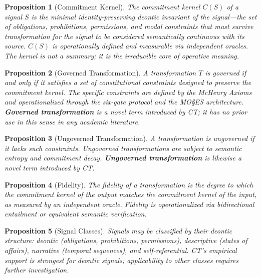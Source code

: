 \documentclass[11pt,a4paper]{article}
\newtheorem{proposition}{Proposition}[section]
\begin{document}
\begin{proposition}[Commitment Kernel]
The \emph{commitment kernel} $C(S)$ of a signal $S$ is the minimal identity-preserving deontic invariant of the signal---the set of obligations, prohibitions, permissions, and modal constraints that must survive transformation for the signal to be considered semantically continuous with its source. $C(S)$ is operationally defined and measurable via independent oracles. The kernel is not a summary; it is the irreducible core of operative meaning.
\end{proposition}

\begin{proposition}[Governed Transformation]
A transformation $T$ is \emph{governed} if and only if it satisfies a set of constitutional constraints designed to preserve the commitment kernel. The specific constraints are defined by the McHenry Axioms and operationalized through the six-gate protocol and the MO\S{}ES\texttrademark{} architecture. \textbf{Governed transformation} is a novel term introduced by CT; it has no prior use in this sense in any academic literature.
\end{proposition}

\begin{proposition}[Ungoverned Transformation]
A transformation is \emph{ungoverned} if it lacks such constraints. Ungoverned transformations are subject to semantic entropy and commitment decay. \textbf{Ungoverned transformation} is likewise a novel term introduced by CT.
\end{proposition}

\begin{proposition}[Fidelity]
The \emph{fidelity} of a transformation is the degree to which the commitment kernel of the output matches the commitment kernel of the input, as measured by an independent oracle. Fidelity is operationalized via bidirectional entailment or equivalent semantic verification.
\end{proposition}

\begin{proposition}[Signal Classes]
Signals may be classified by their deontic structure: \emph{deontic} (obligations, prohibitions, permissions), \emph{descriptive} (states of affairs), \emph{narrative} (temporal sequences), and \emph{self-referential}. CT's empirical support is strongest for deontic signals; applicability to other classes requires further investigation.
\end{proposition}
\end{document}
